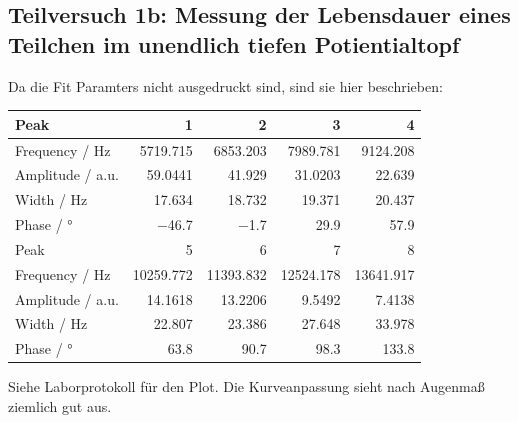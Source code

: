 	\subsection{Teilversuch 1b: Messung der Lebensdauer eines Teilchen im unendlich tiefen Potientialtopf}
		Da die Fit Paramters nicht ausgedruckt sind, sind sie hier beschrieben:
		\begin{center}
			\begin{tabular}{l | *{4}{r}}
				\toprule
				Peak & \num{1} & \num{2} & \num{3} & \num{4} \\
				\midrule
				Frequency / \si{\hertz} & \num{5719.715} & \num{6853.203} & \num{7989.781} & \num{9124.208} \\
				Amplitude / a.u.        & \num{59.0441} & \num{41.929} & \num{31.0203} & \num{22.639} \\
				Width / \si{\hertz}     & \num{17.634} & \num{18.732} & \num{19.371} & \num{20.437} \\
				Phase / \si{\degree}    & \num{-46.7} & \num{-1.7} & \num{29.9} & \num{57.9} \\
				\bottomrule
				\toprule
				Peak & \num{5} & \num{6} & \num{7} & \num{8} \\
				\midrule
				Frequency / \si{\hertz} & \num{10259.772} & \num{11393.832} & \num{12524.178} & \num{13641.917} \\
				Amplitude / a.u.        & \num{14.1618} & \num{13.2206} & \num{9.5492} & \num{7.4138} \\
				Width / \si{\hertz}     & \num{22.807} & \num{23.386} & \num{27.648} & \num{33.978} \\
				Phase / \si{\degree}    & \num{63.8} & \num{90.7} & \num{98.3} & \num{133.8} \\
				\bottomrule
			\end{tabular}
		\end{center}
		Siehe Laborprotokoll für den Plot. Die Kurveanpassung sieht nach Augenmaß ziemlich gut aus. 

